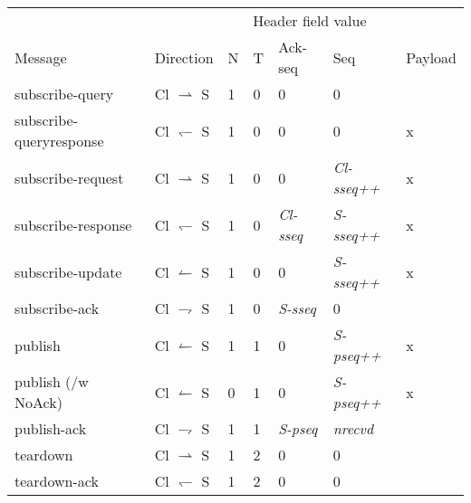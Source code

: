 \begin{tabular}{|l|l|l|l|l|l|l|}
\hline
						& 							& \multicolumn{4}{c|}{Header field value} &	\\
Message					& Direction 				& N	& T	& Ack-seq				& Seq	&	Payload \\
\hline
subscribe-query			& Cl $\rightharpoonup$ S		& 1	& 0 	& 0						& 0	&	\\
\hline
subscribe-queryresponse	& Cl $\leftharpoondown$ S	& 1	& 0		& 0						& 0	&	x \\
\hline
subscribe-request		& Cl $\rightharpoonup$ S		& 1	& 0		& 0						& \emph{Cl-sseq++} &
	x \\
\hline
subscribe-response		& Cl $\leftharpoondown$ S	& 1	& 0		& \emph{Cl-sseq}	& \emph{S-sseq++} &	
	x \\
\hline
subscribe-update		& Cl $\leftharpoonup$ S		& 1	& 0		& 0						& \emph{S-sseq++} &
	x \\
\hline
subscribe-ack			& Cl $\rightharpoondown$ S	& 1	& 0		& \emph{S-sseq}	& 0	&	\\
\hline
publish					& Cl $\leftharpoonup$ S		& 1	& 1		& 0						& \emph{S-pseq++} &
	x \\
\hline
publish	(/w NoAck)      & Cl $\leftharpoonup$ S		& 0	& 1		& 0						& \emph{S-pseq++} &
	x \\
\hline
publish-ack				& Cl $\rightharpoondown$ S	& 1	& 1		& \emph{S-pseq}			& \emph{nrecvd}	&	\\
\hline
teardown		      & Cl $\rightharpoonup$ S		& 1	& 2		& 0			& 0	& \\
\hline
teardown-ack		& Cl $\leftharpoondown$ S 		& 1 & 2		& 0			& 0 &	\\
			
\hline
\end{tabular}